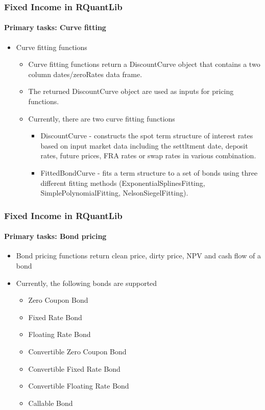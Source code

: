 \documentclass[smaller,compress]{beamer}
\begin{document}
\begin{frame}
	\frametitle{Fixed Income in RQuantLib}
	\framesubtitle{Primary tasks: Curve fitting}
	\begin{itemize}
		\item Curve fitting functions
			\begin{itemize}
				\item Curve fitting functions return a DiscountCurve object that contains a two column dates/zeroRates data frame.
				\item The returned DiscountCurve object are used as inputs for pricing functions. 
				\item Currently, there are two curve fitting functions
					\begin{itemize}
						\item DiscountCurve - constructs the spot term structure of interest rates based on input market data including the settltment date, deposit rates, future prices, FRA rates or swap rates in various combination. \pause
						\item FittedBondCurve - fits a term structure to a set of bonds using three different fitting methods (ExponentialSplinesFitting, SimplePolynomialFitting, NelsonSiegelFitting).
					\end{itemize}
			\end{itemize}
	\end{itemize}
\end{frame}

\begin{frame}
	\frametitle{Fixed Income in RQuantLib}
	\framesubtitle{Primary tasks: Bond pricing}
	\begin{itemize}
		\item Bond pricing functions return clean price, dirty price, NPV and cash flow of a bond
		\item Currently, the following bonds are supported
			\begin{itemize}
				\item Zero Coupon Bond
				\item Fixed Rate Bond
				\item Floating Rate Bond
				\item Convertible Zero Coupon Bond
				\item Convertible Fixed Rate Bond												
				\item Convertible Floating Rate Bond
				\item Callable Bond
			\end{itemize}
	\end{itemize}
\end{frame}
\end{document}
